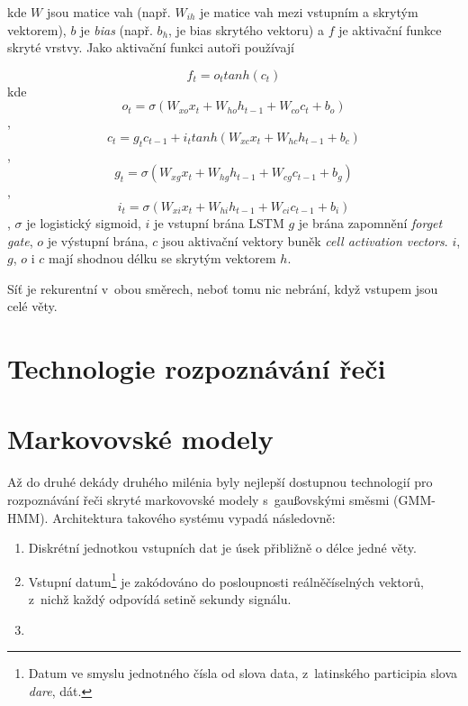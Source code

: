 kde $W$ jsou matice vah (např. $W_{ih}$ je matice vah mezi vstupním a skrytým
vektorem), $b$ je \textit{bias} (např. $b_h$, je bias skrytého vektoru) a $f$ je
aktivační funkce skryté vrstvy. Jako aktivační funkci autoři používají

\begin{equation}
f_t = o_t tanh(c_t)
\end{equation}
kde
\begin{equation}
o_t = \sigma(W_{xo}x_t + W_{ho}h_{t-1} + W_{co}c_t + b_o)
\end{equation}
,
\begin{equation}
c_t = g_{t}c_{t-1} + i_t tanh(W_{xc}x_t + W_{hc}h_{t-1} + b_c)
\end{equation}
,
\begin{equation}
g_t = \sigma(W_{xg}x_t + W_{hg}h_{t-1} + W_{cg}c_{t-1} + b_g)
\end{equation}
,
\begin{equation}
i_t = \sigma(W_{xi}x_t + W_{hi}h_{t-1} + W_{ci}c_{t-1} + b_i)
\end{equation}
, $\sigma$ je logistický sigmoid, $i$ je vstupní brána LSTM $g$ je brána zapomnění
\textit{forget gate}, $o$ je výstupní brána, $c$ jsou aktivační vektory buněk
\textit{cell activation vectors}. $i$, $g$, $o$ i $c$ mají shodnou délku se
skrytým vektorem $h$.

Síť je rekurentní v~obou směrech, neboť tomu nic nebrání, když vstupem jsou celé
věty. 

\section{Technologie rozpoznávání řeči}

\section{Markovovské modely}

Až do druhé dekády druhého milénia byly nejlepší dostupnou technologií pro
rozpoznávání řeči skryté markovovské modely s~gaußovskými směsmi (GMM-HMM).
Architektura takového systému vypadá následovně:

\begin{enumerate}
\item{Diskrétní jednotkou vstupních dat je úsek přibližně o délce jedné věty.}
\item{Vstupní datum\footnote{Datum ve smyslu jednotného čísla od slova data,
z~latinského participia slova \textit{dare}, dát.} je zakódováno do posloupnosti
reálněčíselných vektorů, z~nichž každý odpovídá setině sekundy signálu.}
\item{}
\end{enumerate}

